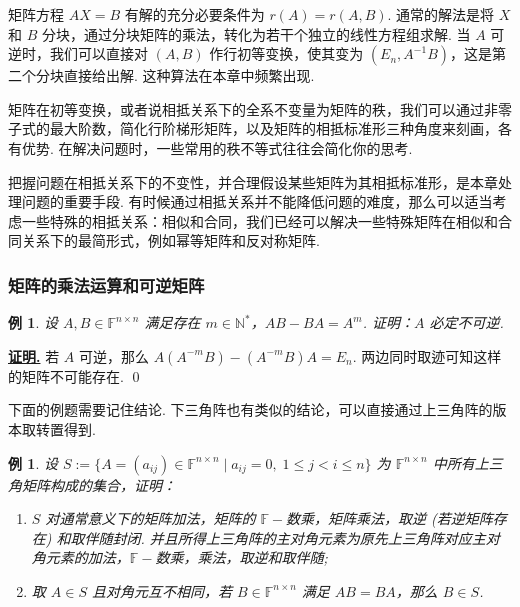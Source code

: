 \documentclass[10pt,openany]{article}
\theoremstyle{thmstyle} %
\theoremstyle{defstyle} %
\theoremstyle{prostyle} %
\theoremstyle{exastyle}
\newtheorem{example}[theorem]{例}
\theoremstyle{remstyle}
\renewenvironment{proof}[1][证明]{\par\underline{\textbf{#1.}} \;\fangsong}{\qed\par}
\newcommand{\F}{\mathbb{F}}
\newcommand{\n}{^{n \times n}}
\begin{document}
矩阵方程 \( AX=B \) 有解的充分必要条件为 \( r(A)=r(A,B) \). 通常的解法是将 \( X \) 和 \( B \) 分块，通过分块矩阵的乘法，转化为若干个独立的线性方程组求解. 当 \( A \) 可逆时，我们可以直接对 \( (A,B) \) 作行初等变换，使其变为 \( (E_n,A^{-1}B) \)，这是第二个分块直接给出解. 这种算法在本章中频繁出现.

矩阵在初等变换，或者说相抵关系下的全系不变量为矩阵的秩，我们可以通过非零子式的最大阶数，简化行阶梯形矩阵，以及矩阵的相抵标准形三种角度来刻画，各有优势. 在解决问题时，一些常用的秩不等式往往会简化你的思考.

把握问题在相抵关系下的不变性，并合理假设某些矩阵为其相抵标准形，是本章处理问题的重要手段. 有时候通过相抵关系并不能降低问题的难度，那么可以适当考虑一些特殊的相抵关系：相似和合同，我们已经可以解决一些特殊矩阵在相似和合同关系下的最简形式，例如幂等矩阵和反对称矩阵.

\subsubsection{矩阵的乘法运算和可逆矩阵}

\begin{example}
	设 \( A,B \in \F\n \) 满足存在 \( m \in \mathbb{N}^* \)，\( AB-BA=A^m \). 证明：\( A \) 必定不可逆.
\end{example}

\begin{proof}
	若 \( A \) 可逆，那么 \( A(A^{-m}B)-(A^{-m}B)A=E_n \). 两边同时取迹可知这样的矩阵不可能存在.
\end{proof}


下面的例题需要记住结论. 下三角阵也有类似的结论，可以直接通过上三角阵的版本取转置得到.

\begin{example}
	设 \( S:=\{ A=(a_{ij}) \in \F\n \mid a_{ij}=0, \; 1 \leq j<i \leq n\} \) 为 \( \F\n \) 中所有上三角矩阵构成的集合，证明：
	\begin{enumerate}[(1)]
		\item \( S \) 对通常意义下的矩阵加法，矩阵的 \( \F-\)数乘，矩阵乘法，取逆 (若逆矩阵存在) 和取伴随封闭. 并且所得上三角阵的主对角元素为原先上三角阵对应主对角元素的加法，\( \F-\)数乘，乘法，取逆和取伴随;
		\item 取 \( A \in S \) 且对角元互不相同，若 \( B \in \F\n \) 满足 \( AB=BA \)，那么 \( B \in S \).
	\end{enumerate}
\end{example}
\end{document}
